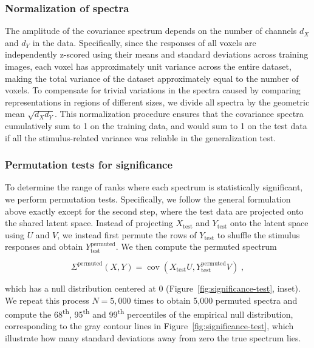 \documentclass[10pt]{article}
\begin{document}
\subsubsection{Normalization of spectra}\label{normalization-of-spectra}

The amplitude of the covariance spectrum depends on the number of channels \(d_X\) and \(d_Y\) in the data. Specifically, since the responses of all voxels are independently z-scored using their means and standard deviations across training images, each voxel has approximately unit variance across the entire dataset, making the total variance of the dataset approximately equal to the number of voxels. To compensate for trivial variations in the spectra caused by comparing representations in regions of different sizes, we divide all spectra by the geometric mean \(\sqrt{d_X d_Y}\). This normalization procedure ensures that the covariance spectra cumulatively sum to 1 on the training data, and would sum to 1 on the test data if all the stimulus-related variance was reliable in the generalization test.

\subsubsection{Permutation tests for significance}\label{permutation-tests-for-significance}

To determine the range of ranks where each spectrum is statistically significant, we perform permutation tests. Specifically, we follow the general formulation above exactly except for the second step, where the test data are projected onto the shared latent space. Instead of projecting \(X_\text{test}\) and \(Y_\text{test}\) onto the latent space using \(U\) and \(V\), we instead first permute the rows of \(Y_\text{test}\) to shuffle the stimulus responses and obtain \(Y_\text{test}^\text{permuted}\). We then compute the permuted spectrum

\[
\Sigma^\text{permuted}(X, Y) = \operatorname{cov}
\left(X_\text{test} U, Y_\text{test}^\text{permuted} V \right)\;,
\]

which has a null distribution centered at 0 (Figure~\ref{fig:significance-test}, inset). We repeat this process \(N = 5,000\) times to obtain 5,000 permuted spectra and compute the 68\textsuperscript{th}, 95\textsuperscript{th} and 99\textsuperscript{th} percentiles of the empirical null distribution, corresponding to the gray contour lines in Figure~\ref{fig:significance-test}, which illustrate how many standard deviations away from zero the true spectrum lies.
\end{document}
